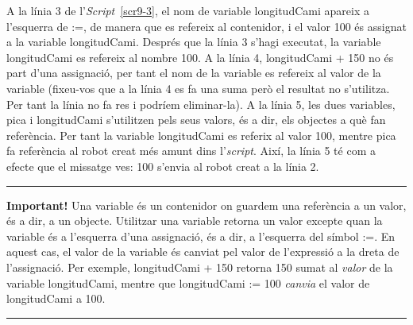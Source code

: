 A la línia 3 de l'\emph{Script}~\ref{scr9-3}, el nom de variable \textsf{longitudCami} apareix a l'esquerra de \textsf{:=}, de manera que es refereix al contenidor, i el valor \textsf{100} és assignat a la variable \textsf{longitudCami}. Després que la línia 3 s'hagi executat, la variable \textsf{longitudCami} es refereix al nombre \textsf{100}. A la línia 4, \textsf{longitudCami + 150} no és part d'una assignació, per tant el nom de la variable es refereix al valor de la variable (fixeu-vos que a la línia 4 es fa una suma però el resultat no s'utilitza. Per tant la línia no fa res i podríem eliminar-la). A la línia 5, les dues variables, \textsf{pica} i \textsf{longitudCami} s'utilitzen pels seus valors, és a dir, els objectes a què fan referència. Per tant la variable \textsf{longitudCami} es referix al valor \textsf{100}, mentre \textsf{pica} fa referència al robot creat més amunt dins l'\emph{script}. Així, la línia 5 té com a efecte que el missatge \textsf{ves: 100} s'envia al robot creat a la línia 2.

\vspace*{3mm}

\noindent
\rule{\textwidth}{2pt}
\noindent
\textbf{Important!} Una variable és un contenidor on guardem una referència a un valor, és a dir, a un objecte. Utilitzar una variable retorna un valor excepte quan la variable és a l'esquerra d'una assignació, és a dir, a l'esquerra del símbol \textsf{:=}. En aquest cas, el valor de la variable és canviat pel valor de l'expressió a la dreta de l'assignació. Per exemple, \textsf{longitudCami + 150} retorna \textsf{150} sumat al \emph{valor} de la variable \textsf{longitudCami}, mentre que \textsf{longitudCami := 100} \emph{canvia} el valor de \textsf{longitudCami} a \textsf{100}.\\
\noindent
\rule{\textwidth}{2pt}

